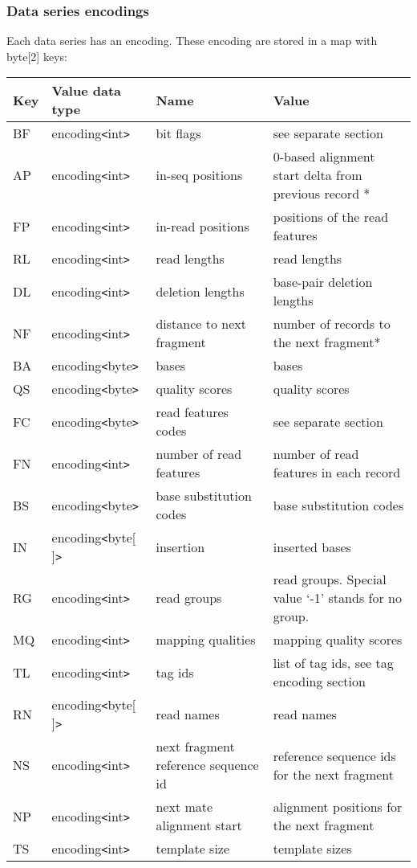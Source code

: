 \documentclass[a4paper]{article}
\begin{document}
\subsubsection*{Data series encodings}

Each data series has an encoding. These encoding are stored in a map with byte[2] 
keys:

\begin{tabular}{|l|l|>{\raggedright}p{100pt}|>{\raggedright}p{220pt}|}
\hline
\textbf{Key} & \textbf{Value data type} & \textbf{Name} & \textbf{Value}\tabularnewline
\hline
BF & encoding\texttt{<}int\texttt{>} & bit flags & see separate section\tabularnewline
\hline
AP & encoding\texttt{<}int\texttt{>} & in-seq positions & 0-based alignment start 
delta from previous record *\tabularnewline
\hline
FP & encoding\texttt{<}int\texttt{>} & in-read positions & positions of the read 
features\tabularnewline
\hline
RL & encoding\texttt{<}int\texttt{>} & read lengths & read lengths\tabularnewline
\hline
DL & encoding\texttt{<}int\texttt{>} & deletion lengths & base-pair deletion lengths\tabularnewline
\hline
NF & encoding\texttt{<}int\texttt{>} & distance to next fragment & number of records 
to the next fragment*\tabularnewline
\hline
BA & encoding\texttt{<}byte\texttt{>} & bases & bases\tabularnewline
\hline
QS & encoding\texttt{<}byte\texttt{>} & quality scores & quality scores\tabularnewline
\hline
FC & encoding\texttt{<}byte\texttt{>} & read features codes & see separate section\tabularnewline
\hline
FN & encoding\texttt{<}int\texttt{>} & number of read features & number of read 
features in each record\tabularnewline
\hline
BS & encoding\texttt{<}byte\texttt{>} & base substitution codes & base substitution 
codes\tabularnewline
\hline
IN & encoding\texttt{<}byte[ ]\texttt{>} & insertion & inserted bases\tabularnewline
\hline
RG & encoding\texttt{<}int\texttt{>} & read groups & read groups. Special value 
`-1' stands for no group.\tabularnewline
\hline
MQ & encoding\texttt{<}int\texttt{>} & mapping qualities & mapping quality scores 
 \tabularnewline
\hline
TL & encoding\texttt{<}int\texttt{>} & tag ids  & list of tag ids, see tag encoding 
section\tabularnewline
\hline
RN & encoding\texttt{<}byte[ ]\texttt{>} & read names & read names\tabularnewline
\hline
NS & encoding\texttt{<}int\texttt{>} & next fragment reference sequence id & reference 
sequence ids for the next fragment \tabularnewline
\hline
NP & encoding\texttt{<}int\texttt{>} & next mate alignment start & alignment positions 
for the next fragment\tabularnewline
\hline
TS & encoding\texttt{<}int\texttt{>} & template size & template sizes\tabularnewline

\end{tabular}
\end{document}
